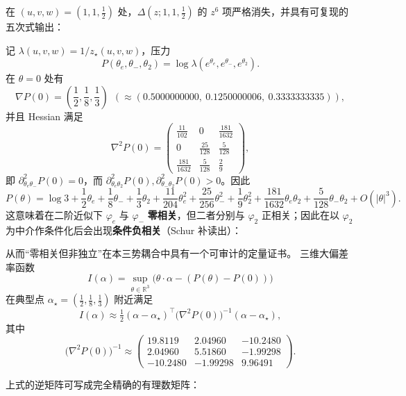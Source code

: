 \begin{proposition}[临界五次式指纹：\texorpdfstring{$(u,v,w)=(1,1,\tfrac12)$}{(u,v,w)=(1,1,1/2)}]\label{prop:sync-kernel-3d-critical-quintic}
在 \((u,v,w)=(1,1,\tfrac12)\) 处，\(\Delta(z;1,1,\tfrac12)\) 的 \(z^6\) 项严格消失，并具有可复现的五次式输出：

\end{proposition}
记 $\lambda(u,v,w)=1/z_\star(u,v,w)$，压力
\[
P(\theta_e,\theta_-,\theta_2)=\log\lambda(e^{\theta_e},e^{\theta_-},e^{\theta_2}).
\]
在 $\theta=0$ 处有
\[
\nabla P(0)=\left(\frac12,\frac18,\frac13\right)
\ \ (\approx (0.5000000000,\ 0.1250000006,\ 0.3333333335)),
\]
并且 Hessian 满足
\[
\nabla^2P(0)=
\begin{pmatrix}
\frac{11}{102} & 0 & \frac{181}{1632}\\
0 & \frac{25}{128} & \frac{5}{128}\\
\frac{181}{1632} & \frac{5}{128} & \frac{2}{9}
\end{pmatrix},
\]
即 $\partial^2_{\theta_e\theta_-}P(0)=0$，而 $\partial^2_{\theta_e\theta_2}P(0),\partial^2_{\theta_-\theta_2}P(0)>0$。因此
\[
P(\theta)=\log 3+\frac12\theta_e+\frac18\theta_-+\frac13\theta_2
+\frac{11}{204}\theta_e^2+\frac{25}{256}\theta_-^2+\frac19\theta_2^2
+\frac{181}{1632}\theta_e\theta_2+\frac{5}{128}\theta_-\theta_2+O(|\theta|^3).
\]
这意味着在二阶近似下 \(\varphi_e\) 与 \(\varphi_-\) \textbf{零相关}，但二者分别与 \(\varphi_2\) 正相关；因此在以 \(\varphi_2\) 为中介作条件化后会出现\textbf{条件负相关}（Schur 补读出）：



\noindent
从而“零相关但非独立”在本三势耦合中具有一个可审计的定量证书。
三维大偏差率函数
\[
I(\alpha)=\sup_{\theta\in\mathbb{R}^3}\bigl(\theta\cdot\alpha-(P(\theta)-P(0))\bigr)
\]
在典型点 $\alpha_\star=(\frac12,\frac18,\frac13)$ 附近满足
\[
I(\alpha)\approx \tfrac12(\alpha-\alpha_\star)^\top\bigl(\nabla^2P(0)\bigr)^{-1}(\alpha-\alpha_\star),
\]
其中
\[
\bigl(\nabla^2P(0)\bigr)^{-1}\approx
\begin{pmatrix}
19.8119 & 2.04960 & -10.2480\\
2.04960 & 5.51860 & -1.99298\\
-10.2480 & -1.99298 & 9.96491
\end{pmatrix}.
\]
\begin{proposition}\label{prop:sync-kernel-3d-hessian-inverse-exact}
上式的逆矩阵可写成完全精确的有理数矩阵：

\end{proposition}

